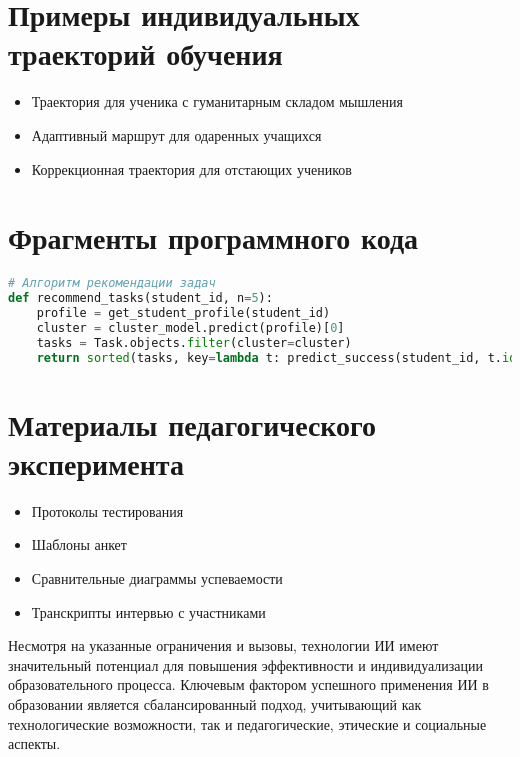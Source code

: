 \documentclass[a4paper,14pt]{extreport}
\begin{document}
\appendix
\chapter{Примеры индивидуальных траекторий обучения}
\begin{itemize}
    \item Траектория для ученика с гуманитарным складом мышления
    \item Адаптивный маршрут для одаренных учащихся
    \item Коррекционная траектория для отстающих учеников
\end{itemize}

\chapter{Фрагменты программного кода}
\begin{lstlisting}[language=Python]
# Алгоритм рекомендации задач
def recommend_tasks(student_id, n=5):
    profile = get_student_profile(student_id)
    cluster = cluster_model.predict(profile)[0]
    tasks = Task.objects.filter(cluster=cluster)
    return sorted(tasks, key=lambda t: predict_success(student_id, t.id))[:n]
\end{lstlisting}

\chapter{Материалы педагогического эксперимента}
\begin{itemize}
    \item Протоколы тестирования
    \item Шаблоны анкет
    \item Сравнительные диаграммы успеваемости
    \item Транскрипты интервью с участниками
\end{itemize}
Несмотря на указанные ограничения и вызовы, технологии ИИ имеют значительный потенциал для повышения эффективности и индивидуализации образовательного процесса. Ключевым фактором успешного применения ИИ в образовании является сбалансированный подход, учитывающий как технологические возможности, так и педагогические, этические и социальные аспекты.
\end{document}
